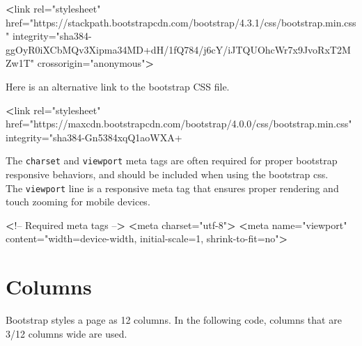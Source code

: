 \documentclass[]{book}
\newenvironment{Shaded}{\begin{snugshade}}{\end{snugshade}}
\newcommand{\ExtensionTok}[1]{#1}
\newcommand{\FunctionTok}[1]{\textcolor[rgb]{0.00,0.00,0.00}{#1}}
\newcommand{\NormalTok}[1]{#1}
\newcommand{\OperatorTok}[1]{\textcolor[rgb]{0.81,0.36,0.00}{\textbf{#1}}}
\newcommand{\StringTok}[1]{\textcolor[rgb]{0.31,0.60,0.02}{#1}}
\begin{document}
\begin{Shaded}
\begin{Highlighting}[]
\OperatorTok{<}\FunctionTok{link}\NormalTok{ rel=}\StringTok{"stylesheet"}\NormalTok{ href=}\StringTok{"https://stackpath.bootstrapcdn.com/bootstrap/4.3.1/css/bootstrap.min.css"}\NormalTok{ integrity=}\StringTok{"sha384-ggOyR0iXCbMQv3Xipma34MD+dH/1fQ784/j6cY/iJTQUOhcWr7x9JvoRxT2MZw1T"}\NormalTok{ crossorigin=}\StringTok{"anonymous"}\OperatorTok{>}
\end{Highlighting}
\end{Shaded}

Here is an alternative link to the bootstrap CSS file.

\begin{Shaded}
\begin{Highlighting}[]
\OperatorTok{<}\FunctionTok{link}\NormalTok{ rel=}\StringTok{"stylesheet"}\NormalTok{ href=}\StringTok{"https://maxcdn.bootstrapcdn.com/bootstrap/4.0.0/css/bootstrap.min.css"}\NormalTok{ integrity=}\StringTok{"sha384-Gn5384xqQ1aoWXA+}
\end{Highlighting}
\end{Shaded}

The \texttt{charset} and \texttt{viewport} meta tags are often required for proper bootstrap responsive behaviors, and should be included when using the bootstrap css.\\
The \texttt{viewport} line is a responsive meta tag that ensures proper rendering and touch zooming for mobile devices.

\begin{Shaded}
\begin{Highlighting}[]
\OperatorTok{<}\NormalTok{!}\ExtensionTok{--}\NormalTok{ Required meta tags --}\OperatorTok{>}
    \OperatorTok{<}\ExtensionTok{meta}\NormalTok{ charset=}\StringTok{"utf-8"}\OperatorTok{>}
    \OperatorTok{<}\ExtensionTok{meta}\NormalTok{ name=}\StringTok{"viewport"}\NormalTok{ content=}\StringTok{"width=device-width, initial-scale=1, shrink-to-fit=no"}\OperatorTok{>}
\end{Highlighting}
\end{Shaded}

\hypertarget{columns}{%
\section{Columns}\label{columns}}

Bootstrap styles a page as 12 columns. In the following code, columns that are 3/12 columns wide are used.
\end{document}

